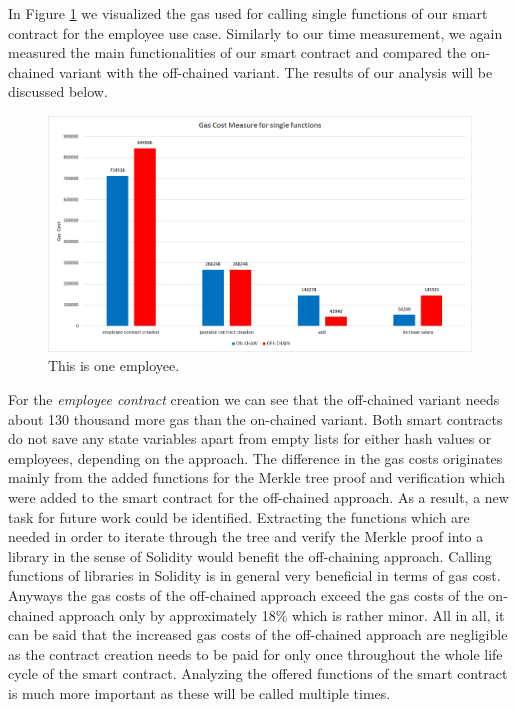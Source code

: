 In Figure \ref{fig:05_gas_cost_single} we visualized the gas used for calling single functions of our smart contract for the employee use case.
Similarly to our time measurement, we again measured the main functionalities of our smart contract and compared the on-chained variant with the off-chained variant.
The results of our analysis will be discussed below.

\begin{figure}[t]
	\centering
	\includegraphics[width=1.0\textwidth]{images/05_evaluation/05_gas_cost_single.png}
	\caption{\label{fig:05_gas_cost_single}This is one employee.}
\end{figure}

For the \textit{employee contract} creation we can see that the off-chained variant needs about 130 thousand more gas than the on-chained variant.
Both smart contracts do not save any state variables apart from empty lists for either hash values or employees, depending on the approach.
The difference in the gas costs originates mainly from the added functions for the Merkle tree proof and verification which were added to the smart contract for the off-chained approach.
As a result, a new task for future work could be identified.
Extracting the functions which are needed in order to iterate through the tree and verify the Merkle proof into a library in the sense of Solidity would benefit the off-chaining approach.
Calling functions of libraries in Solidity is in general very beneficial in terms of gas cost.
Anyways the gas costs of the off-chained approach exceed the gas costs of the on-chained approach only by approximately 18\% which is rather minor.
All in all, it can be said that the increased gas costs of the off-chained approach are negligible as the contract creation needs to be paid for only once throughout the whole life cycle of the smart contract.
Analyzing the offered functions of the smart contract is much more important as these will be called multiple times.

